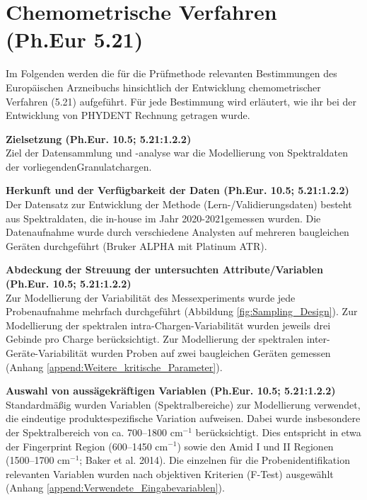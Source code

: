 \documentclass[11pt, a4paper]{article}
\newcommand\VersionPhEur{10.5}
\newcommand\DateRange{2020-2021}
\begin{document}
\appendix

\section{Chemometrische Verfahren (Ph.Eur 5.21)}
\label{append:Chemometrische_Verfahren}

Im Folgenden werden die für die Prüfmethode relevanten Bestimmungen des Europäischen Arzneibuchs hinsichtlich der Entwicklung chemometrischer Verfahren (5.21) aufgeführt. Für jede Bestimmung wird erläutert, wie ihr bei der Entwicklung von PHYDENT Rechnung getragen wurde. 

\textbf{Zielsetzung (Ph.Eur. \VersionPhEur; 5.21:1.2.2)}\\[1.2pt]
Ziel der Datensammlung und -analyse war die Modellierung von Spektraldaten der vorliegendenGranulatchargen.

\textbf{Herkunft und der Verfügbarkeit der Daten (Ph.Eur. \VersionPhEur; 5.21:1.2.2)}\\[1.2pt]
Der Datensatz zur Entwicklung der Methode (Lern-/Validierungsdaten) besteht aus Spektraldaten, die in-house im Jahr \DateRange gemessen wurden. Die Datenaufnahme wurde durch verschiedene Analysten auf mehreren baugleichen Geräten durchgeführt (Bruker ALPHA mit Platinum ATR).

\textbf{Abdeckung der Streuung der untersuchten Attribute/Variablen (Ph.Eur. \VersionPhEur; 5.21:1.2.2)}\\[1.2pt]
Zur Modellierung der Variabilität des Messexperiments wurde jede Probenaufnahme mehrfach durchgeführt (Abbildung \ref{fig:Sampling_Design}). Zur Modellierung der spektralen intra-Chargen-Variabilität wurden jeweils drei Gebinde pro Charge berücksichtigt. Zur Modellierung der spektralen inter-Geräte-Variabilität wurden Proben auf zwei baugleichen Geräten gemessen (Anhang \ref{append:Weitere_kritische_Parameter}).

\textbf{Auswahl von aussägekräftigen Variablen (Ph.Eur. \VersionPhEur; 5.21:1.2.2)} \\[1.2pt]
Standardmäßig wurden Variablen (Spektralbereiche) zur Modellierung verwendet, die eindeutige produktespezifische Variation aufweisen. Dabei wurde insbesondere der Spektralbereich von ca. 700–1800 cm$^{-1}$ berücksichtigt. Dies entspricht in etwa der Fingerprint Region (600–1450 cm$^{-1}$) sowie den Amid I und II Regionen (1500–1700 cm$^{-1}$; Baker et al. 2014). Die einzelnen für die Probenidentifikation relevanten Variablen wurden nach objektiven Kriterien (F-Test) ausgewählt (Anhang \ref{append:Verwendete_Eingabevariablen}).
\end{document}
